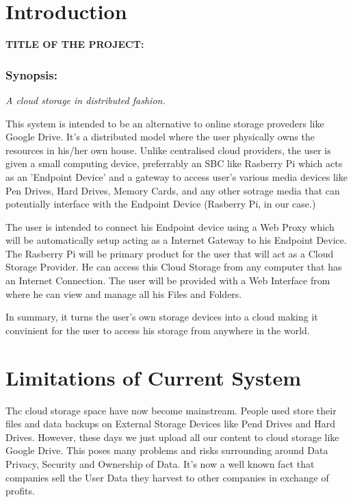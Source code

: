 \documentclass[12pt]{article}
\makeatletter
\let\inserttitle\@title
\makeatother
\begin{document}
\iftrue  %


\section{Introduction}
\vspace{1cm}
\textbf{\uppercase{Title of the Project:}} \quad\textbf{\MakeUppercase{\inserttitle}}
\bigskip
\subsubsection{Synopsis:} \quad\quad
\textit{A cloud storage in distributed fashion.} \\ \par
This system is intended to be an alternative to online storage proveders like Google Drive. It's a distributed model where the user physically owns the resources in his/her own house. Unlike centralised cloud providers, the user is given a small computing device, preferrably an SBC like Rasberry Pi which acts as an 'Endpoint Device' and a gateway to access user's various media devices like Pen Drives, Hard Drives, Memory Cards, and any other sotrage media that can potentially interface with the Endpoint Device (Rasberry Pi, in our case.) \\ \par
The user is intended to connect his Endpoint device using a Web Proxy which will be automatically setup acting as a Internet Gateway to his Endpoint Device. The Rasberry Pi will be primary product for the user that will act as a Cloud Storage Provider. He can access this Cloud Storage from any computer that has an Internet Connection. The user will be provided with a Web Interface from where he can view and manage all his Files and Folders. \\
\par
In summary, it turns the user's own storage devices into a cloud making it convinient for the user to access his storage from anywhere in the world.


\section{Limitations of Current System}
\vspace{2cm}
\quad\quad Thc cloud storage space have now become mainstream. People used store their files and data backups on External Storage Devices like Pend Drives and Hard Drives. However, these days we just upload all our content to cloud storage like Google Drive. This poses many problems and risks surrounding around Data Privacy, Security and Ownership of Data. It's now a well known fact that companies sell the User Data they harvest to other companies in exchange of profits. \\
\end{document}
